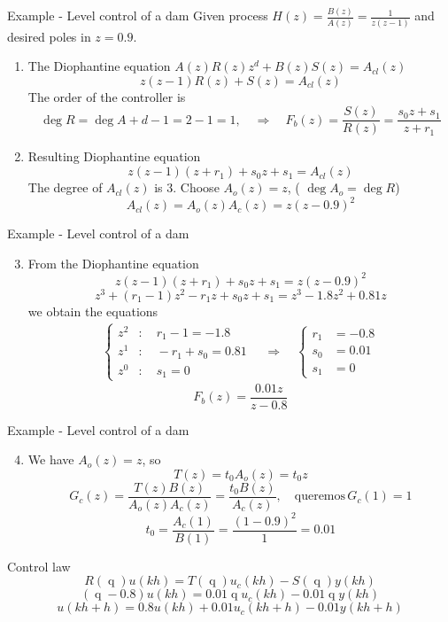 \documentclass[presentation,aspectratio=169]{beamer}
\DeclareMathOperator{\shift}{q}
\begin{document}
\begin{frame}[label={sec:orgba26ae0}]{Example - Level control of a dam}
Given process \(H(z) = \frac{B(z)}{A(z)} = \frac{1}{z(z-1)}\) and desired poles in \(z=0.9\).

\begin{enumerate}
\item The Diophantine equation \(A(z)R(z)z^d + B(z)S(z) = A_{cl}(z)\)
\[ z(z-1)R(z) + S(z) = A_{cl}(z)\]
The order of the controller is
\[\deg R = \deg A + d - 1 = 2-1 = 1, \quad \Rightarrow \quad F_b(z)=\frac{S(z)}{R(z)} = \frac{s_0z + s_1}{z + r_1}\]
\item Resulting Diophantine equation
\[ z(z-1)(z+r_1) + s_0z + s_1 = A_{cl}(z)\]
The degree of \(A_{cl}(z)\) is 3. Choose \(A_o(z) = z\),  ( \(\deg A_o = \deg R\)) 
\[ A_{cl}(z) = A_o(z) A_c(z) = z(z-0.9)^2\]
\end{enumerate}
\end{frame}

\begin{frame}[label={sec:org86841ed}]{Example - Level control of a dam}
\begin{enumerate}
\setcounter{enumi}{2}
\item From the Diophantine equation \[ z(z-1)(z+r_1) + s_0z + s_1 = z(z-0.9)^2\]
\[ z^3 + (r_1-1)z^2 - r_1z + s_0z + s_1 = z^3 -1.8z^2 + 0.81z\]
we obtain the equations
\begin{align*}
\begin{cases} z^2 &: \quad r_1-1 = -1.8\\
z^1 &: \quad -r_1 + s_0 = 0.81\\
z^0 &: \quad s_1 = 0
\end{cases}
\quad \Rightarrow \quad 
\begin{cases} r_1 &= -0.8\\ s_0 &= 0.01\\ s_1 &=0 \end{cases}
\end{align*}
\[F_b(z) = \frac{0.01z}{z - 0.8}\]
\end{enumerate}
\end{frame}

\begin{frame}[label={sec:org469e042}]{Example - Level control of a dam}
\begin{enumerate}
\setcounter{enumi}{3}
\item We have \(A_o(z) = z\), so 
\[T(z) = t_0A_o(z) = t_0z\]
\[G_c(z) = \frac{T(z)B(z)}{A_o(z)A_c(z)} = \frac{t_0 B(z)}{A_c(z)}, \quad \text{queremos}\, G_c(1)=1\]
\[ t_0 = \frac{A_c(1)}{B(1)} = \frac{(1-0.9)^2}{1} = 0.01\]
\end{enumerate}

\alert{Control law}
\[R(\shift) u(kh) = T(\shift)u_c(kh) - S(\shift)y(kh)\]
\[ (\shift - 0.8)u(kh) = 0.01\shift u_c(kh) - 0.01\shift y(kh)\]
\[ u(kh+h) = 0.8u(kh) + 0.01 u_c(kh+h) - 0.01y(kh+h)\]
\end{frame}
\end{document}
